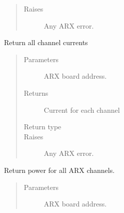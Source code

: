 \documentclass[letterpaper,10pt,english]{sphinxmanual}
\begin{document}
\begin{fulllineitems}
\begin{fulllineitems}
\begin{quote}
\begin{description}
\item[{Raises}] \leavevmode
{} \textendash{} Any ARX error.

\end{description}\end{quote}

\end{fulllineitems}


\begin{fulllineitems}
\label{\detokenize{index:lwautils.lwa_arx.ARX.get_all_chan_current}}
Return all channel currents
\begin{quote}\begin{description}
\item[{Parameters}] \leavevmode
{} \textendash{} ARX board address.

\item[{Returns}] \leavevmode
Current for each channel

\item[{Return type}] \leavevmode
{}

\item[{Raises}] \leavevmode
{} \textendash{} Any ARX error.

\end{description}\end{quote}

\end{fulllineitems}


\begin{fulllineitems}
\label{\detokenize{index:lwautils.lwa_arx.ARX.get_all_chan_power}}
Return power for all ARX channels.
\begin{quote}\begin{description}
\item[{Parameters}] \leavevmode
{} \textendash{} ARX board address.


\end{description}
\end{quote}
\end{fulllineitems}
\end{fulllineitems}
\end{document}
